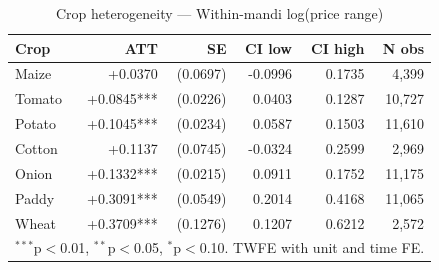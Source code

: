 \begin{table}[htbp]
\centering
\caption{Crop heterogeneity — Within-mandi log(price range)}
\label{tab:spec1_within_mandi_crops}
\begin{tabular}{lrrrrr}
\hline\hline
Crop & ATT & SE & CI low & CI high & N obs \\
\hline
Maize & +0.0370 & (0.0697) & -0.0996 & 0.1735 & 4,399 \\
Tomato & +0.0845*** & (0.0226) & 0.0403 & 0.1287 & 10,727 \\
Potato & +0.1045*** & (0.0234) & 0.0587 & 0.1503 & 11,610 \\
Cotton & +0.1137 & (0.0745) & -0.0324 & 0.2599 & 2,969 \\
Onion & +0.1332*** & (0.0215) & 0.0911 & 0.1752 & 11,175 \\
Paddy & +0.3091*** & (0.0549) & 0.2014 & 0.4168 & 11,065 \\
Wheat & +0.3709*** & (0.1276) & 0.1207 & 0.6212 & 2,572 \\
\hline\hline
\multicolumn{6}{l}{\footnotesize $^{***}$p$<$0.01, $^{**}$p$<$0.05, $^{*}$p$<$0.10. TWFE with unit and time FE.} \\
\end{tabular}
\end{table}